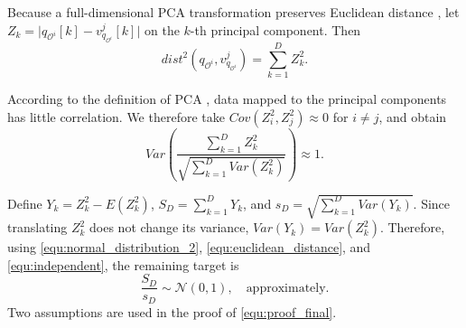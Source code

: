Because a full-dimensional PCA transformation preserves Euclidean distance
\cite{ukey2023efficient}, let
$Z_k=\lvert q_{\mathcal{O}^i}[k]-v^{j}_{q_{\mathcal{O}^i}}[k]\rvert$ on the
$k$-th principal component. Then
\begin{equation}
dist^2(q_{\mathcal{O}^i},v^{j}_{q_{\mathcal{O}^i}})
=\sum_{k=1}^{D}Z_k^2 .
\label{equ:euclidean_distance}
\end{equation}

According to the definition of PCA \cite{mackiewicz1993principal}, data
mapped to the principal components has little correlation. We therefore
take $Cov(Z_i^2,Z_j^2)\approx0$ for $i\neq j$, and obtain
\begin{equation}
Var\!\left(\frac{\sum_{k=1}^{D}Z_k^2}
{\sqrt{\sum_{k=1}^{D}Var(Z_k^2)}}\right)\approx1 .
\label{equ:independent}
\end{equation}

Define $Y_k=Z_k^2-E(Z_k^2)$, $S_D=\sum_{k=1}^{D}Y_k$, and
$s_D=\sqrt{\sum_{k=1}^{D}Var(Y_k)}$. Since translating $Z_k^2$ does not
change its variance, $Var(Y_k)=Var(Z_k^2)$. Therefore, using
\eqref{equ:normal_distribution_2}, \eqref{equ:euclidean_distance}, and
\eqref{equ:independent}, the remaining target is
\begin{equation}
\frac{S_D}{s_D}\sim \mathcal{N}(0,1),\quad \text{approximately}.
\label{equ:proof_final}
\end{equation}
Two assumptions are used in the proof of \eqref{equ:proof_final}.

